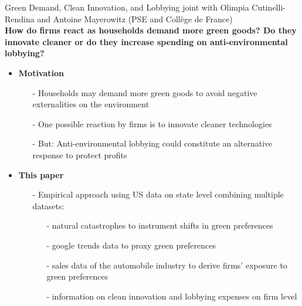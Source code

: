 \begin{frame}{Green Demand, Clean Innovation, and Lobbying}
	\vspace{-5mm}
\hspace{-6mm}\footnotesize{joint with Olimpia Cutinelli-Rendina and Antoine Mayerowitz (PSE and Collège de France)}\\

\footnotesize
\vspace{3mm}
\textbf{\alert{How do firms react as households demand more green goods? Do they innovate cleaner or do they increase spending on anti-environmental lobbying?}}
\pause
\begin{itemize}[<+->]
 \item \textbf{Motivation }
 \begin{itemize}
 	\item[-] Households may demand more green goods to avoid negative externalities on the environment \footnotesize{\citep{Benabou2010IndividualResponsibility, Bartling2015DoResponsibility}}
 	\item[-] One possible reaction by firms is to innovate cleaner technologies \footnotesize{\citep{Aghion2021EnvironmentalDirty}}
 	\item[-] But: Anti-environmental lobbying could constitute an alternative response to protect profits
 \end{itemize}
\item \textbf{This paper}
\begin{itemize}
	\item[-] Empirical approach using US data on state level combining multiple datasets:
	\begin{itemize}
		\item[-] natural catastrophes to instrument shifts in green preferences
		\item[-] google trends data to proxy green preferences
		\item[-] sales data of the automobile industry to derive firms' exposure to green preferences
		\item[-] information on clean innovation and lobbying expenses on firm level
	\end{itemize}
\end{itemize}
\end{itemize}
\end{frame}


